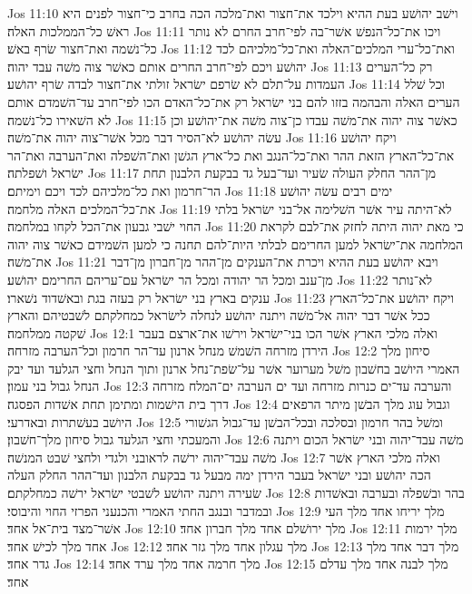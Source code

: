 Jos 11:10  וישׁב יהושׁע בעת ההיא וילכד את־חצור ואת־מלכה הכה בחרב כי־חצור לפנים היא ראשׁ כל־הממלכות האלה׃
Jos 11:11  ויכו את־כל־הנפשׁ אשׁר־בה לפי־חרב החרם לא נותר כל־נשׁמה ואת־חצור שׂרף באשׁ׃
Jos 11:12  ואת־כל־ערי המלכים־האלה ואת־כל־מלכיהם לכד יהושׁע ויכם לפי־חרב החרים אותם כאשׁר צוה משׁה עבד יהוה׃
Jos 11:13  רק כל־הערים העמדות על־תלם לא שׂרפם ישׂראל זולתי את־חצור לבדה שׂרף יהושׁע׃
Jos 11:14  וכל שׁלל הערים האלה והבהמה בזזו להם בני ישׂראל רק את־כל־האדם הכו לפי־חרב עד־השׁמדם אותם לא השׁאירו כל־נשׁמה׃
Jos 11:15  כאשׁר צוה יהוה את־משׁה עבדו כן־צוה משׁה את־יהושׁע וכן עשׂה יהושׁע לא־הסיר דבר מכל אשׁר־צוה יהוה את־משׁה׃
Jos 11:16  ויקח יהושׁע את־כל־הארץ הזאת ההר ואת־כל־הנגב ואת כל־ארץ הגשׁן ואת־השׁפלה ואת־הערבה ואת־הר ישׂראל ושׁפלתה׃
Jos 11:17  מן־ההר החלק העולה שׂעיר ועד־בעל גד בבקעת הלבנון תחת הר־חרמון ואת כל־מלכיהם לכד ויכם וימיתם׃
Jos 11:18  ימים רבים עשׂה יהושׁע את־כל־המלכים האלה מלחמה׃
Jos 11:19  לא־היתה עיר אשׁר השׁלימה אל־בני ישׂראל בלתי החוי ישׁבי גבעון את־הכל לקחו במלחמה׃
Jos 11:20  כי מאת יהוה היתה לחזק את־לבם לקראת המלחמה את־ישׂראל למען החרימם לבלתי היות־להם תחנה כי למען השׁמידם כאשׁר צוה יהוה את־משׁה׃
Jos 11:21  ויבא יהושׁע בעת ההיא ויכרת את־הענקים מן־ההר מן־חברון מן־דבר מן־ענב ומכל הר יהודה ומכל הר ישׂראל עם־עריהם החרימם יהושׁע׃
Jos 11:22  לא־נותר ענקים בארץ בני ישׂראל רק בעזה בגת ובאשׁדוד נשׁארו׃
Jos 11:23  ויקח יהושׁע את־כל־הארץ ככל אשׁר דבר יהוה אל־משׁה ויתנה יהושׁע לנחלה לישׂראל כמחלקתם לשׁבטיהם והארץ שׁקטה ממלחמה׃
Jos 12:1  ואלה מלכי הארץ אשׁר הכו בני־ישׂראל וירשׁו את־ארצם בעבר הירדן מזרחה השׁמשׁ מנחל ארנון עד־הר חרמון וכל־הערבה מזרחה׃
Jos 12:2  סיחון מלך האמרי היושׁב בחשׁבון משׁל מערוער אשׁר על־שׂפת־נחל ארנון ותוך הנחל וחצי הגלעד ועד יבק הנחל גבול בני עמון׃
Jos 12:3  והערבה עד־ים כנרות מזרחה ועד ים הערבה ים־המלח מזרחה דרך בית הישׁמות ומתימן תחת אשׁדות הפסגה׃
Jos 12:4  וגבול עוג מלך הבשׁן מיתר הרפאים היושׁב בעשׁתרות ובאדרעי׃
Jos 12:5  ומשׁל בהר חרמון ובסלכה ובכל־הבשׁן עד־גבול הגשׁורי והמעכתי וחצי הגלעד גבול סיחון מלך־חשׁבון׃
Jos 12:6  משׁה עבד־יהוה ובני ישׂראל הכום ויתנה משׁה עבד־יהוה ירשׁה לראובני ולגדי ולחצי שׁבט המנשׁה׃
Jos 12:7  ואלה מלכי הארץ אשׁר הכה יהושׁע ובני ישׂראל בעבר הירדן ימה מבעל גד בבקעת הלבנון ועד־ההר החלק העלה שׂעירה ויתנה יהושׁע לשׁבטי ישׂראל ירשׁה כמחלקתם׃
Jos 12:8  בהר ובשׁפלה ובערבה ובאשׁדות ובמדבר ובנגב החתי האמרי והכנעני הפרזי החוי והיבוסי׃
Jos 12:9  מלך יריחו אחד מלך העי אשׁר־מצד בית־אל אחד׃
Jos 12:10  מלך ירושׁלם אחד מלך חברון אחד׃
Jos 12:11  מלך ירמות אחד מלך לכישׁ אחד׃
Jos 12:12  מלך עגלון אחד מלך גזר אחד׃
Jos 12:13  מלך דבר אחד מלך גדר אחד׃
Jos 12:14  מלך חרמה אחד מלך ערד אחד׃
Jos 12:15  מלך לבנה אחד מלך עדלם אחד׃

